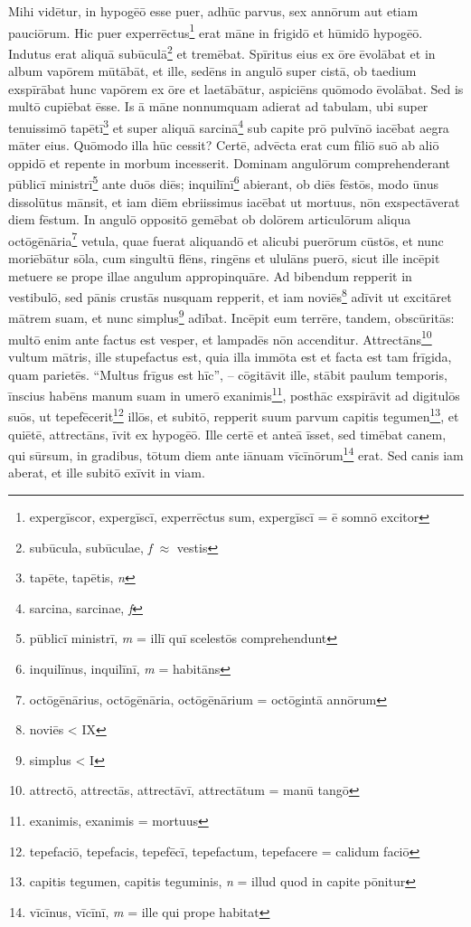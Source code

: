 \documentclass[a4paper, 12pt]{article}
\begin{document}
\begin{linenumbers}
	\vspace{3ex}
	
	Mihi vidētur, in hypogēō esse puer, adhūc parvus, sex annōrum aut etiam pauciōrum.
	Hic puer experrēctus\footnote{expergīscor, expergīscī, experrēctus sum, expergīscī = ē somnō excitor} erat māne in frigidō et hūmidō hypogēō.
	Indutus erat aliquā subūculā\footnote{subūcula, subūculae, \textit{f} $\approx$ vestis} et tremēbat.
	Spīritus eius ex ōre ēvolābat et in album vapōrem mūtābāt, et ille, sedēns in angulō super cistā, ob taedium exspīrābat hunc vapōrem ex ōre et laetābātur, aspiciēns quōmodo ēvolābat.
	Sed is multō cupiēbat ēsse.
	Is ā māne nonnumquam adierat ad tabulam, ubi super tenuissimō tapētī\footnote{tapēte, tapētis, \textit{n}} et super aliquā sarcinā\footnote{sarcina, sarcinae, \textit{f}} sub capite prō pulvīnō iacēbat aegra māter eius.
	Quōmodo illa hūc cessit?
	Certē, advēcta erat cum fīliō suō ab aliō oppidō et repente in morbum incesserit.
	Dominam angulōrum comprehenderant pūblicī ministrī\footnote{pūblicī ministrī, \textit{m} = illī quī scelestōs comprehendunt} ante duōs diēs;
	inquilīnī\footnote{inquilīnus, inquilīnī, \textit{m} = habitāns} abierant, ob diēs fēstōs, modo ūnus dissolūtus mānsit, et iam diēm ebriissimus iacēbat ut mortuus, nōn exspectāverat diem fēstum.
	In angulō oppositō gemēbat ob dolōrem articulōrum aliqua octōgēnāria\footnote{octōgēnārius, octōgēnāria, octōgēnārium = octōgintā annōrum} vetula, quae fuerat aliquandō et alicubi puerōrum cūstōs, et nunc moriēbātur sōla, cum singultū flēns, ringēns et ululāns puerō, sicut ille incēpit metuere se prope illae angulum appropinquāre.
	Ad bibendum repperit in vestibulō, sed pānis crustās nusquam repperit, et iam noviēs\footnote{noviēs < IX} adīvit ut excitāret mātrem suam, et nunc simplus\footnote{simplus < I} adībat.
	Incēpit eum terrēre, tandem, obscūritās: multō enim ante factus est vesper, et lampadēs nōn accenditur.
	Attrectāns\footnote{attrectō, attrectās, attrectāvī, attrectātum = manū tangō} vultum mātris, ille stupefactus est, quia illa immōta est et facta est tam frīgida, quam parietēs.
	``Multus frīgus est hīc'', -- cōgitāvit ille, stābit paulum temporis, īnscius habēns manum suam in umerō exanimis\footnote{exanimis, exanimis = mortuus}, posthāc exspirāvit ad digitulōs suōs, ut tepefēcerit\footnote{tepefaciō, tepefacis, tepefēcī, tepefactum, tepefacere = calidum faciō} illōs, et subitō, repperit suum parvum capitis tegumen\footnote{capitis tegumen, capitis teguminis, \textit{n} = illud quod in capite pōnitur}, et quiētē, attrectāns, īvit ex hypogēō.
	Ille certē et anteā īsset, sed timēbat canem, qui sūrsum, in gradibus, tōtum diem ante iānuam vīcīnōrum\footnote{vīcīnus, vīcīnī, \textit{m} = ille qui prope habitat} erat.
	Sed canis iam aberat, et ille subitō exīvit in viam.
	

\end{linenumbers}
\end{document}
